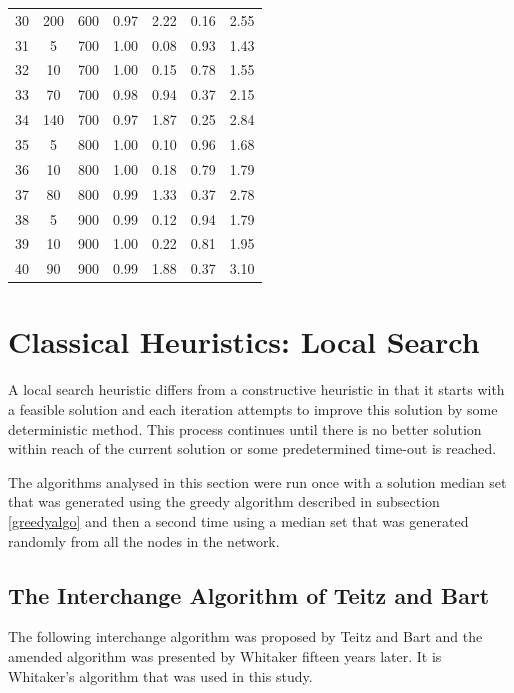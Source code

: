 \documentclass[11pt]{article}
\begin{document}
\begin{table}[]
\begin{tabular}{ccccccc}
			30 & 200 & 600 & 0.97 & 2.22 & 0.16 & 2.55 \\ 
			\rowcolor[HTML]{EFEFEF} 
			31 & 5 & 700 & 1.00 & 0.08 & 0.93 & 1.43 \\ 
			\rowcolor[HTML]{EFEFEF} 
			32 & 10 & 700 & 1.00 & 0.15 & 0.78 & 1.55 \\ 
			\rowcolor[HTML]{EFEFEF} 
			33 & 70 & 700 & 0.98 & 0.94 & 0.37 & 2.15 \\ 
			\rowcolor[HTML]{EFEFEF} 
			34 & 140 & 700 & 0.97 & 1.87 & 0.25 & 2.84 \\
			35 & 5 & 800 & 1.00 & 0.10 & 0.96 & 1.68 \\ 
			36 & 10 & 800 & 1.00 & 0.18 & 0.79 & 1.79 \\ 
			37 & 80 & 800 & 0.99 & 1.33 & 0.37 & 2.78 \\ 
			\rowcolor[HTML]{EFEFEF} 
			38 & 5 & 900 & 0.99 & 0.12 & 0.94 & 1.79 \\ 
			\rowcolor[HTML]{EFEFEF} 
			39 & 10 & 900 & 1.00 & 0.22 & 0.81 & 1.95 \\ 
			\rowcolor[HTML]{EFEFEF} 
			40 & 90 & 900 & 0.99 & 1.88 & 0.37 & 3.10 \\ 
		\end{tabular}
	\end{table}
	
	
	\section{Classical Heuristics: Local Search} \label{classicheuristics.localsearch}
	A local search heuristic differs from a constructive heuristic in that it starts with a feasible solution and each iteration attempts to improve this solution by some deterministic method.  This process continues until there is no better solution within reach of the current solution or some predetermined time-out is reached.
	
	The algorithms analysed in this section were run once with a solution median set that was generated using the greedy algorithm described in subsection \ref{greedyalgo} and then a second time using a median set that was generated randomly from all the nodes in the network.
	
	\subsection{The Interchange Algorithm of Teitz and Bart} \label{tbalgo} 
	The following interchange algorithm was proposed by Teitz and Bart \cite{TEIT68} and the amended algorithm was presented by Whitaker \cite{WHIT83} fifteen years later.  It is Whitaker's algorithm that was used in this study.
	
\end{document}
